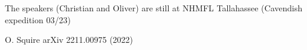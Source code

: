 \begin{frame}[label=TitlePage]
\centerline{\scriptsize The speakers (Christian and Oliver) are still at NHMFL Tallahassee (Cavendish expedition 03/23)}
%
%
%
%
%
%
\vspace{0em}
\centerline{\makebox[\linewidth]{\rule{0.85\textwidth}{0.4pt}}}

\centerline{\scriptsize O. Squire arXiv 2211.00975 (2022)}

\end{frame}

